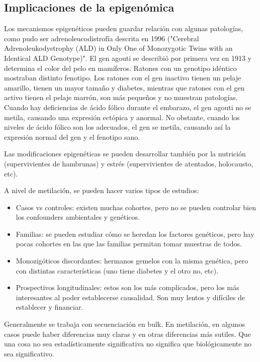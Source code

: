 \subsection{Implicaciones de la epigenómica}
Los mecanismos epigenéticos pueden guardar relación con algunas patologías, como pudo ser adrenoleucodistrofía descrita en 1996 ("Cerebral Adrenoleukodystrophy (ALD) in Only One of Monozygotic Twins with an Identical ALD Genotype)". El gen agouti se describió por primera vez en 1913 y determina el color del pelo en mamíferos. Ratones con un genotipo idéntico mostraban distinto fenotipo. Los ratones con el gen inactivo tienen un pelaje amarillo, tienen un mayor tamaño y diabetes, mientras que ratones con el gen activo tienen el pelaje marrón, son más pequeños y no muestran patologías. 
Cuando hay deficiencias de ácido fólico durante el embarazo, el gen agouti no se metila, causando una expresión ectópica y anormal. No obstante, cuando los niveles de ácido fólico son los adecuados, el gen se metila, causando así la expresión normal del gen y el fenotipo sano.

Las modificaciones epigenéticas se pueden desarrollar también por la nutrición (supervivientes de hambrunas) y estrés (supervivientes de atentados, holocausto, etc). 

A nivel de metilación, se pueden hacer varios tipos de estudios:
\begin{itemize}
\item Casos vs controles: existen muchas cohortes, pero no se pueden controlar bien los confounders ambientales y genéticos.
\item Familias: se pueden estudiar cómo se heredan los factores genéticos, pero hay pocas cohortes en las que las familias permitan tomar muestras de todos.
\item Monozigóticos discordantes: hermanos gemelos con la misma genética, pero con distintas características (uno tiene diabetes y el otro no, etc). 
\item Prospectivos longitudinales: estos son los más complicados, pero los más interesantes al poder establecerse causalidad. Son muy lentos y difíciles de establecer y financiar. 
\end{itemize}

Generalmente se trabaja con secuenciación en bulk. En metilación, en algunos casos puede haber diferencias muy claras y en otras diferencias más sutiles. Que una cosa no sea estadísticamente significativa no significa que biológicamente no sea significativo. 

